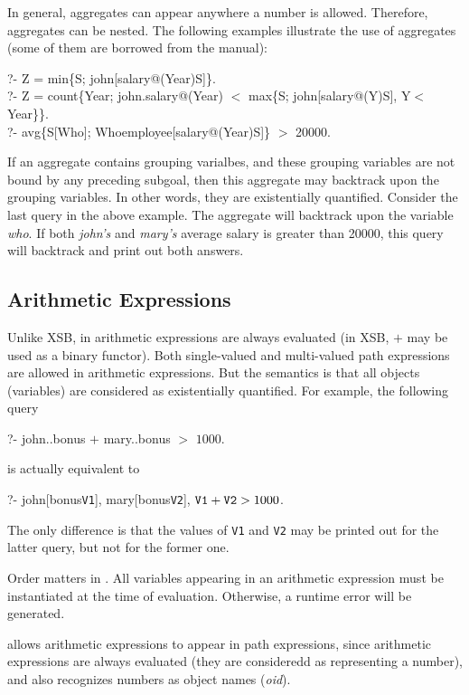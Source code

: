 \documentclass[11pt]{report}
\begin{document}
In general, aggregates can appear anywhere a number is allowed. Therefore, aggregates can
be nested. The following examples illustrate the use of aggregates (some of them are borrowed
from the \FLORID manual):
\begin{qrules}
?- Z = min\{S; john[salary@(Year){\fd}S]\}. \\
?- Z = count\{Year; john.salary@(Year) $<$ max\{S; john[salary@(Y){\fd}S], Y$<$Year\}\}. \\
?- avg\{S[Who]; Who{\isa}employee[salary@(Year){\fd}S]\} $>$ 20000.
\end{qrules}

If an aggregate contains grouping varialbes, and these grouping variables are not bound
by any preceding subgoal, then this aggregate may backtrack upon the grouping variables. In
other words, they are existentially quantified. Consider the last query in the above example.
The aggregate will backtrack upon the variable {\it who}. If both {\it john's} and {\it mary's}
average salary is greater than 20000, this query will backtrack and print out both answers.

\subsection{Arithmetic Expressions}

Unlike XSB, in \FLORA arithmetic expressions are always evaluated (in XSB, $+$ may be used
as a binary functor). Both single-valued and multi-valued path expressions are allowed in
arithmetic expressions. But the semantics is that all objects (variables) are considered as
existentially quantified. For example, the following query
\begin{qrules}
?- john..bonus $+$ mary..bonus $>$ $1000$.
\end{qrules}
is actually equivalent to
\begin{qrules}
?- john[bonus{\mvd}{\tt V1}], mary[bonus{\mvd}{\tt V2}], ${\tt V1}+{\tt V2} > 1000$.
\end{qrules}
The only difference is that the values of {\tt V1} and {\tt V2} may be printed out for the
latter query, but not for the former one.

Order matters in \FLORA. All variables appearing in an arithmetic expression must be
instantiated at the time of evaluation. Otherwise, a runtime error will be generated.

\FLORA allows arithmetic expressions to appear in path expressions, since arithmetic
expressions are always evaluated (they are consideredd as representing a number), and \FLORA
also recognizes numbers as object names ({\it oid}).
\end{document}

